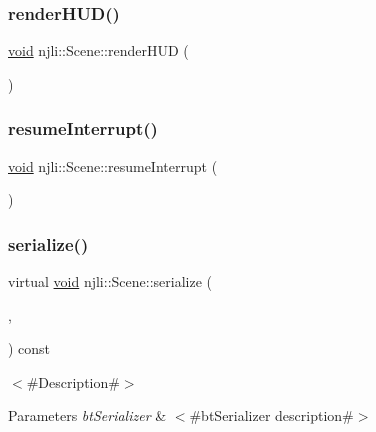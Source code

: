 \subsubsection{\texorpdfstring{render\+H\+U\+D()}{renderHUD()}}
{\footnotesize\ttfamily \mbox{\hyperlink{_thread_8h_af1e856da2e658414cb2456cb6f7ebc66}{void}} njli\+::\+Scene\+::render\+H\+UD (\begin{DoxyParamCaption}{ }\end{DoxyParamCaption})}

\mbox{\label{classnjli_1_1_scene_a5f6ff76f0029b35b9b0ec17ea0be302e}} 
\subsubsection{\texorpdfstring{resume\+Interrupt()}{resumeInterrupt()}}
{\footnotesize\ttfamily \mbox{\hyperlink{_thread_8h_af1e856da2e658414cb2456cb6f7ebc66}{void}} njli\+::\+Scene\+::resume\+Interrupt (\begin{DoxyParamCaption}{ }\end{DoxyParamCaption})}

\mbox{\label{classnjli_1_1_scene_a09f66453d56234e0c2e7d85116b8d6d6}} 
\subsubsection{\texorpdfstring{serialize()}{serialize()}}
{\footnotesize\ttfamily virtual \mbox{\hyperlink{_thread_8h_af1e856da2e658414cb2456cb6f7ebc66}{void}} njli\+::\+Scene\+::serialize (\begin{DoxyParamCaption}\item[{\mbox{\hyperlink{_thread_8h_af1e856da2e658414cb2456cb6f7ebc66}{void}} $\ast$}]{,  }\item[{bt\+Serializer $\ast$}]{ }\end{DoxyParamCaption}) const\hspace{0.3cm}{\ttfamily [virtual]}}

$<$\#\+Description\#$>$


\begin{DoxyParams}{Parameters}
{\em bt\+Serializer} & $<$\#bt\+Serializer description\#$>$ \\
\hline
\end{DoxyParams}


